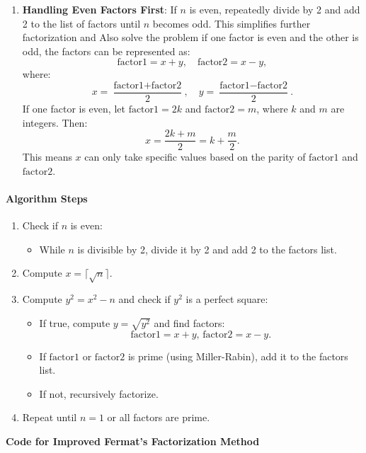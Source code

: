 \documentclass[12pt]{report}
\begin{document}
\begin{enumerate}
    \item \textbf{Handling Even Factors First}:  
        If $n$ is even, repeatedly divide by 2 and add 2 to the list of factors until $n$ becomes odd. This simplifies further factorization and Also solve the problem if one factor is even and the other is odd, the factors can be represented as:
\[
        \text{factor1} = x + y, \quad \text{factor2} = x - y,
\]
        where:
\[
        x = \frac{\text{factor1} + \text{factor2}}{2}, \quad y = \frac{\text{factor1} - \text{factor2}}{2}.
\]
        If one factor is even, let $\text{factor1} = 2k$ and $\text{factor2} = m$, where $k$ and $m$ are integers. Then:
\[
        x = \frac{2k + m}{2} = k + \frac{m}{2}.
\]
        This means $x$ can only take specific values based on the parity of $\text{factor1}$ and $\text{factor2}$.
\end{enumerate}

\paragraph{Algorithm Steps}

\begin{enumerate}
    \item Check if $n$ is even:
    \begin{itemize}
        \item While $n$ is divisible by 2, divide it by 2 and add 2 to the factors list.
    \end{itemize}
    \item Compute $x = \lceil \sqrt{n} \rceil$.
    \item Compute $y^2 = x^2 - n$ and check if $y^2$ is a perfect square:
    \begin{itemize}
        \item If true, compute $y = \sqrt{y^2}$ and find factors:
\[
        \text{factor1} = x + y, \, \text{factor2} = x - y.
\]
        \item If $\text{factor1}$ or $\text{factor2}$ is prime (using Miller-Rabin), add it to the factors list.
        \item If not, recursively factorize.
    \end{itemize}
    \item Repeat until $n = 1$ or all factors are prime.
\end{enumerate}

\begin{center}
    \item \textbf{Code for Improved Fermat's Factorization Method}
\end{center}
\end{document}
